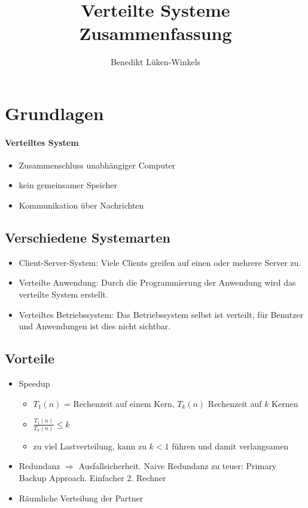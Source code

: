 \documentclass{scrartcl}
\title{Verteilte Systeme \\Zusammenfassung}
\author{Benedikt Lüken-Winkels}
\begin{document}
\maketitle
\tableofcontents
\newpage

%
%

\section{Grundlagen}

\paragraph{Verteiltes System}
\begin{itemize}
\item Zusammenschluss unabhängiger Computer
\item kein gemeinsamer Speicher 
\item Kommunikation über Nachrichten 
\end{itemize} 


\subsection{Verschiedene Systemarten}

\begin{itemize}
\item Client-Server-System: Viele Clients greifen auf einen oder mehrere Server zu.
\item Verteilte Anwendung: Durch die Programmierung der Anwendung wird das verteilte System erstellt.
\item Verteiltes Betriebssystem: Das Betriebssystem selbst ist verteilt, für Benutzer und Anwendungen ist dies nicht sichtbar.
\end{itemize}




\subsection{Vorteile} \label{vort}

\begin{itemize}
\item Speedup
\begin{itemize}
\item $T_1(n)$ = Rechenzeit auf einem Kern, $T_k(n)$ Rechenzeit auf $k$ Kernen 
\item $\frac{T_1(n)}{T_k(n)} \leq k$
\item zu viel Lastverteilung, kann zu $k<1$ führen und damit verlangsamen
\end{itemize} 
\item Redundanz $\Rightarrow$ Ausfallsicherheit. Naive Redundanz zu teuer: Primary Backup Approach. Einfacher 2. Rechner
\item Räumliche Verteilung der Partner
\end{itemize}
\end{document}
